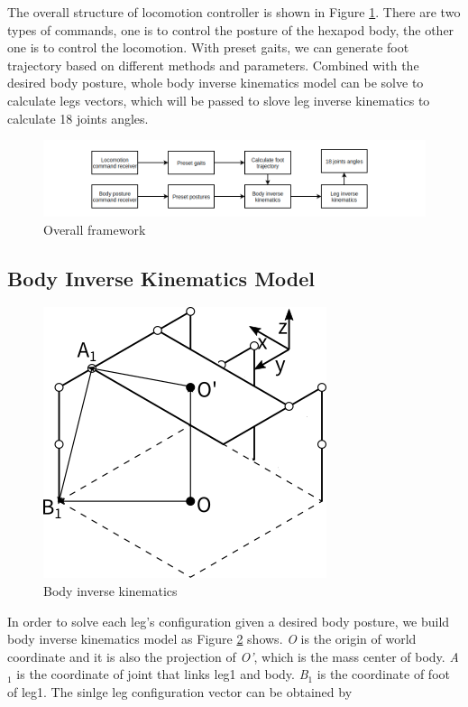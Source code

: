 \documentclass[conference]{IEEEtran}
\begin{document}
The overall structure of locomotion controller is shown in Figure \ref{fig4}. There are two types of commands, one is to control the posture of the hexapod body, the other one is to control the locomotion. With preset gaits, we can generate foot trajectory based on different methods and parameters. Combined with the desired body posture, whole body inverse kinematics model can be solve to calculate legs vectors, which will be passed to slove leg inverse kinematics to calculate 18 joints angles.

\begin{figure}
    \centerline{\includegraphics[scale = 0.3]{framework.png}}
    \caption{Overall framework}
    \label{fig4}
\end{figure}

\subsection{Body Inverse Kinematics Model}
\begin{figure}
    \centerline{\includegraphics{body_IK.png}}
    \caption{Body inverse kinematics}
    \label{fig1}
\end{figure}
In order to solve each leg's configuration given a desired body posture, we build body inverse kinematics model as Figure \ref{fig1} shows. \textit{O} is the origin of world coordinate and it is also the projection of \textit{O'}, which is the mass center of body. \textit{A$_{1}$} is the coordinate of joint that links leg1 and body. \textit{B$_{1}$} is the coordinate of foot of leg1. The sinlge leg configuration vector can be obtained by 
\end{document}
